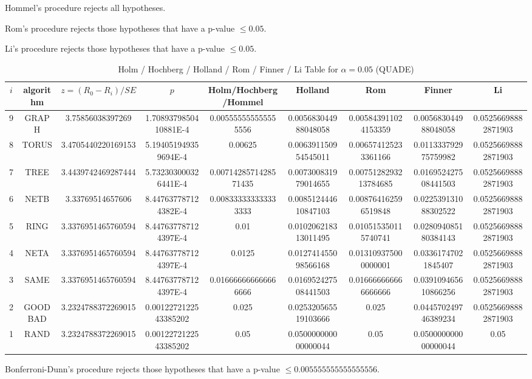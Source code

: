 \documentclass[a4paper,10pt]{article}
\begin{document}
\begin{landscape}
Hommel's procedure rejects all hypotheses.


Rom's procedure rejects those hypotheses that have a p-value $\le0.05$.


Li's procedure rejects those hypotheses that have a p-value $\le0.05$.



\newpage

\begin{table}[!htp]
\centering\scriptsize
\caption{Holm / Hochberg / Holland / Rom / Finner / Li Table for $\alpha=0.05$ (QUADE)}
\begin{tabular}{ccccccccc}
$i$&algorithm&$z=(R_0 - R_i)/SE$&$p$&Holm/Hochberg/Hommel&Holland&Rom&Finner&Li\\
\hline
9& GRAPH&3.75856038397269&1.7089379850410881E-4&0.005555555555555556&0.005683044988048058&0.005843911024153359&0.005683044988048058&0.05256698882871903\\
8& TORUS&3.4705440220169153&5.194051949359694E-4&0.00625&0.006391150954545011&0.006574125233361166&0.011333792975759982&0.05256698882871903\\
7& TREE&3.4439742469287444&5.732303000326441E-4&0.0071428571428571435&0.007300831979014655&0.0075128293213784685&0.016952427508441503&0.05256698882871903\\
6& NETB&3.33769514657606&8.447637787124382E-4&0.008333333333333333&0.008512444610847103&0.008764162596519848&0.022539131088302522&0.05256698882871903\\
5& RING&3.3376951465760594&8.447637787124397E-4&0.01&0.010206218313011495&0.010515350115740741&0.028094085180384143&0.05256698882871903\\
4& NETA&3.3376951465760594&8.447637787124397E-4&0.0125&0.012741455098566168&0.013109375000000001&0.03361747021845407&0.05256698882871903\\
3& SAME&3.3376951465760594&8.447637787124397E-4&0.016666666666666666&0.016952427508441503&0.016666666666666666&0.039109465610866256&0.05256698882871903\\
2& GOODBAD&3.2324788372269015&0.0012272122543385202&0.025&0.025320565519103666&0.025&0.044570249746389234&0.05256698882871903\\
1& RAND&3.2324788372269015&0.0012272122543385202&0.05&0.050000000000000044&0.05&0.050000000000000044&0.05\\
\hline
\end{tabular}
\end{table}
Bonferroni-Dunn's procedure rejects those hypotheses that have a p-value $\le0.005555555555555556$.



\end{landscape}
\end{document}
